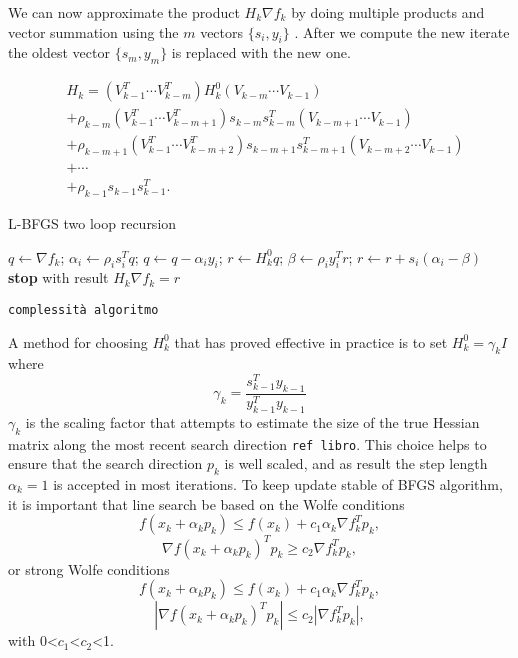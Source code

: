 We can now approximate the product $H_{k}\nabla f_{k}$ by doing multiple products and vector summation using the $m$ vectors $\{s_{i},y_{i}\}$ . After we compute the new iterate the oldest vector $\{s_{m},y_{m}\}$ is replaced with the new one.

\begin{equation} 
\begin{aligned}
&H_{k}=(V^T_{k-1}\cdots V^T_{k-m})H^0_{k}(V_{k-m}\cdots V_{k-1})\\           
&+\rho_{k-m}(V^T_{k-1}\cdots V^T_{k-m+1})s_{k-m}s^T_{k-m}(V_{k-m+1}\cdots V_{k-1})\\
&+\rho_{k-m+1}(V^T_{k-1}\cdots V^T_{k-m+2})s_{k-m+1}s^T_{k-m+1}(V_{k-m+2}\cdots V_{k-1})\\
&+ \cdots \\
&+\rho_{k-1}s_{k-1}s^T_{k-1}.  
\end{aligned}
\end{equation}


\begin{algorithm}[H]
	\caption{L-BFGS two loop recursion}
	\label{}
	\begin{algorithmic}[3]
	
		\State $q \gets \nabla f_{k}$;
        \State $ \alpha_{i} \gets \rho_{i}s^T_{i}q$;
        \State $q \gets q - \alpha_{i}y_{i}$; 
      \EndFor
 	  \State $r \gets H^0_{k}q$;
 	  \State $\beta \gets \rho_{i}y^T_{i}r$; 
 	  \State $r \gets r + s_{i}(\alpha_{i}-\beta)$
 	  \EndFor
	  \State \textbf{stop} with result $H_{k}\nabla f_{k}=r$
	\end{algorithmic}
\end{algorithm}

\texttt{complessità algoritmo}

A method for choosing $H^0_{k}$ that has proved effective in practice is to set $H^0_{k}=\gamma_{k}I$  where 
\begin{equation}
\gamma_{k}= \frac{s^T_{k-1}y_{k-1}}{y^T_{k-1}y_{k-1}}
\end{equation}
$\gamma_{k}$ is the scaling factor that attempts to estimate the size of the true Hessian matrix along the most recent search direction \texttt{ref libro}. This choice helps to ensure that the search direction $p_{k}$ is well scaled, and as result the step length $\alpha_{k}=1$ is accepted in most iterations. To keep update stable of BFGS algorithm, it is important that line search be based on the Wolfe conditions
\begin{equation}
f(x_k + \alpha_kp_k ) \leq f (x_k ) + c_1 \alpha_k \nabla f_k^T p_k,
\end{equation}
\begin{equation}
\nabla f(x_k + \alpha_{k} p_k )^T p_k \geq c_2 \nabla f_k^T p_k ,
\end{equation}
or strong Wolfe conditions
\begin{equation}
f(x_k + \alpha_kp_k ) \leq f (x_k ) + c_1 \alpha_k \nabla f_k^T p_k,
\end{equation}
\begin{equation}
|\nabla f(x_k + \alpha_{k} p_k )^T p_k| \leq c_2 |\nabla f_k^T p_k| ,
\end{equation}
with 0<$c_1$<$c_2$<1.

